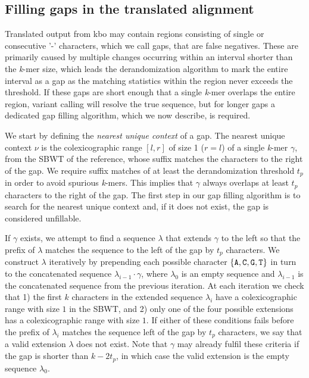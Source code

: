 \documentclass[unnumsec,webpdf,modern,large]{biorxiv}%
\theoremstyle{thmstyleone}%
\theoremstyle{thmstyletwo}%
\theoremstyle{thmstylethree}%
\begin{document}
\subsection{Filling gaps in the translated alignment}
Translated output from {\sf kbo} may contain regions consisting of single or consecutive '-' characters, which we call gaps, that are false negatives. These are primarily caused by multiple changes occurring within an interval shorter than the \emph{k}-mer size, which leads the derandomization algorithm to mark the entire interval as a gap as the matching statistics within the region never exceeds the threshold. If these gaps are short enough that a single \emph{k}-mer overlaps the entire region, variant calling will resolve the true sequence, but for longer gaps a dedicated gap filling algorithm, which we now describe, is required.

We start by defining the \textit{nearest unique context} of a gap. %
The nearest unique context $\nu$ is the colexicographic range $\left[l,r\right]$ of size 1  ($r=l$) of a single \emph{k}-mer $\gamma$, from the SBWT of the reference, whose suffix matches the characters to the right of the gap. We require suffix matches of at least the derandomization threshold $t_p$ in order to avoid spurious \emph{k}-mers. This implies that $\gamma$ always overlaps at least $t_p$ characters to the right of the gap. The first step in our gap filling algorithm is to search for the nearest unique context and, if it does not exist, the gap is considered unfillable.

If $\gamma$ exists, we attempt to find a sequence $\lambda$ that extends $\gamma$ to the left so that the prefix of $\lambda$ matches the sequence to the left of the gap by $t_p$ characters. We construct $\lambda$ iteratively by prepending each possible character $\left\{ {\tt A,C,G,T}\right\}$ in turn to the concatenated sequence $\lambda_{i - 1} \cdot \gamma$, where $\lambda_0$ is an empty sequence and $\lambda_{i - 1}$ is the concatenated sequence from the previous iteration. At each iteration we check that 1) the first $k$ characters in the extended sequence $\lambda_i$ have a colexicographic range with size $1$ in the SBWT, and 2) only one of the four possible extensions has a colexicographic range with size $1$. If either of these conditions fails before the prefix of $\lambda_i$ matches the sequence left of the gap by $t_p$ characters, we say that a valid extension $\lambda$ does not exist. Note that $\gamma$ may already fulfil these criteria if the gap is shorter than $k - 2t_p$, in which case the valid extension is the empty sequence $\lambda_0$.
\end{document}
